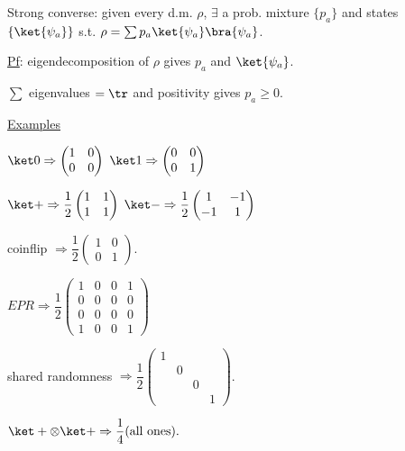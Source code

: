 \documentclass[11pt]{article}
\begin{document}
Strong converse: given every d.m. $\rho$, $\exists$ a prob. mixture $\{p_a\}$ and states $\{\ket{\psi_a}\}$ s.t. $\rho = \sum p_a\ket{\psi_a}\bra{\psi_a}$.

\underline{Pf}: eigendecomposition of $\rho$ gives $p_a$ and $\ket{\psi_a}$.

$\sum$ eigenvalues $= \tr$ and positivity gives $p_a\geq0$.

\underline{Examples}

$\ket0 \Rightarrow \begin{pmatrix}1&0\\0&0\end{pmatrix}$ \qquad $\ket1 \Rightarrow \begin{pmatrix}0&0\\0&1\end{pmatrix}$

$\ket+ \Rightarrow \dfrac12\begin{pmatrix}1&1\\1&1\end{pmatrix}$ \qquad $\ket- \Rightarrow \dfrac12\begin{pmatrix}1&-1\\-1&1\end{pmatrix}$

coinflip $\Rightarrow \dfrac12\begin{pmatrix}1&0\\0&1\end{pmatrix}$.

$EPR \Rightarrow \dfrac12\begin{pmatrix}1&0&0&1\\0&0&0&0\\0&0&0&0\\1&0&0&1\end{pmatrix}$

shared randomness $\Rightarrow \dfrac12\begin{pmatrix}1&&&\\&0&&\\&&0&\\&&&1\end{pmatrix}$.

$\ket+\otimes\ket+ \Rightarrow \dfrac14(\text{all ones}).$
\end{document}
